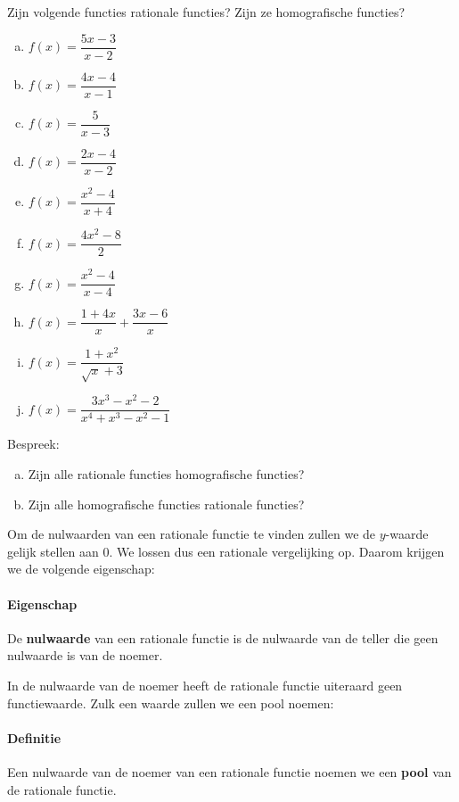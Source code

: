 \documentclass[12pt]{article}
\begin{document}
\begin{oefening}
Zijn volgende functies rationale functies? Zijn ze homografische functies?
\begin{multicols}{2}
\begin{enumerate}[(a)]
  \itemsep1em
  \item $f(x)=\dfrac{5x-3}{x-2}$
  \item $f(x)=\dfrac{4x-4}{x-1}$
  \item $f(x)=\dfrac{5}{x-3}$
  \item $f(x)=\dfrac{2x-4}{x-2}$
  \item $f(x)=\dfrac{x^2-4}{x+4}$
  \item $f(x)=\dfrac{4x^2-8}{2}$
  \item $f(x)=\dfrac{x^2-4}{x-4}$
  \item $f(x)=\dfrac{1+4x}{x}+\dfrac{3x-6}{x}$
  \item $f(x)=\dfrac{1+x^2}{\sqrt{x}+3}$
  \item $f(x)=\dfrac{3x^3-x^2-2}{x^4+x^3-x^2-1}$
\end{enumerate}
\end{multicols}
\end{oefening}

\begin{oefening}
Bespreek:
\begin{enumerate}[(a)]
  \item Zijn alle rationale functies homografische functies?
  \item Zijn alle homografische functies rationale functies?
\end{enumerate}
\end{oefening}

\begin{theorie}

Om de nulwaarden van een rationale functie te vinden zullen we de $y$-waarde gelijk stellen aan $0$. We lossen dus een rationale vergelijking op. Daarom krijgen we de volgende eigenschap:

\paragraph*{Eigenschap}
\begin{mdframed}
De {\bf nulwaarde} van een rationale functie is de nulwaarde van de teller die geen nulwaarde is van de noemer.
\end{mdframed}

In de nulwaarde van de noemer heeft de rationale functie uiteraard geen functiewaarde. Zulk een waarde zullen we een pool noemen:

\paragraph*{Definitie}
\begin{mdframed}
Een nulwaarde van de noemer van een rationale functie noemen we een {\bf pool} van de rationale functie.
\end{mdframed}

\end{theorie}
\end{document}
